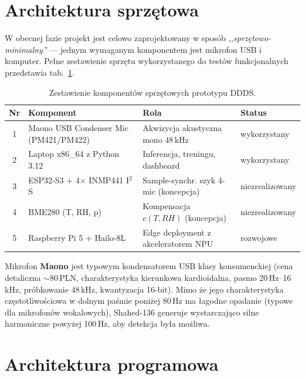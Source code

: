 \documentclass[11pt,a4paper]{article}
\newcommand{\tabref}[1]{tab.~\ref{#1}}
\begin{document}
\section{Architektura sprzętowa}

W obecnej fazie projekt jest celowo zaprojektowany w sposób
\emph{,,sprzętowo-minimalny''} --- jednym wymaganym komponentem jest mikrofon USB
i komputer. Pełne zestawienie sprzętu wykorzystanego do testów funkcjonalnych
przedstawia \tabref{tab:hardware}.

\begin{table}[H]
\centering
\caption{Zestawienie komponentów sprzętowych prototypu DDDS.}
\label{tab:hardware}
\begin{tabularx}{\linewidth}{clXl}
\toprule
\textbf{Nr} & \textbf{Komponent} & \textbf{Rola} & \textbf{Status} \\
\midrule
1 & Maono USB Condenser Mic (PM421/PM422) & Akwizycja akustyczna mono 48\,kHz & wykorzystany \\
2 & Laptop x86\_64 z Python 3.12      & Inferencja, treningu, dashboard       & wykorzystany \\
3 & ESP32-S3 + 4$\times$ INMP441 I$^2$S    & Sample-synchr. szyk 4-mic (koncepcja) & niezrealizowany \\
4 & BME280 (T, RH, p)                 & Kompensacja $c(T,RH)$ (koncepcja)     & niezrealizowany \\
5 & Raspberry Pi 5 + Hailo-8L         & Edge deployment z akceleratorem NPU   & rozwojowe \\
\bottomrule
\end{tabularx}
\end{table}

Mikrofon \textbf{Maono} jest typowym kondensatorem USB klasy konsumenckiej (cena
detaliczna $\sim$80\,PLN, charakterystyka kierunkowa kardioidalna, pasmo
20\,Hz--16\,kHz, próbkowanie 48\,kHz, kwantyzacja 16-bit). Mimo że jego
charakterystyka częstotliwościowa w dolnym paśmie poniżej 80\,Hz ma łagodne
opadanie (typowe dla mikrofonów wokalowych), Shahed-136 generuje wystarczająco
silne harmoniczne powyżej 100\,Hz, aby detekcja była możliwa.

\section{Architektura programowa}
\end{document}
